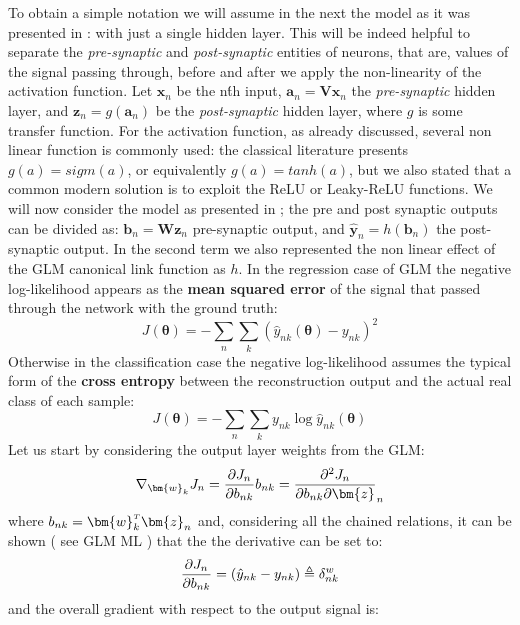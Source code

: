 To obtain a simple notation we will assume in the next the model as it was presented in \Figure{\ref{fig:mlp_a}}: with just a single hidden layer. This will be indeed helpful to separate the \textit{pre-synaptic} and \textit{post-synaptic} entities of neurons, that are, values of the signal passing through, before and after we apply the non-linearity of the activation function. Let $\bm{x}_n$ be the n\'th input, $\bm{a}_n = \bm{V}\bm{x}_n$ the \textit{pre-synaptic} hidden layer, and $\bm{z}_n = g(\bm{a}_n)$ be the \textit{post-synaptic} hidden layer, where $g$ is some transfer function. 
For the activation function, as already discussed, several non linear function is commonly used: the classical literature presents $g(a) = sigm(a)$, or equivalently $g(a) = tanh(a)$, but we also stated that a common modern solution is to exploit the ReLU or Leaky-ReLU functions. 
We will now consider the model as presented in \Equation{\ref{eq:mlp_a}}; the pre and post synaptic outputs can be divided as: $\bm{b}_n = \bm{W}\bm{z}_n$ pre-synaptic output, and $\hat{\bm{y}}_n = h(\bm{b}_n)$ the post-synaptic output. In the second term we also represented the non linear effect of the \acl{GLM} canonical link function as $h$.
In the regression case of \acl{GLM} the negative log-likelihood appears as the \textbf{mean squared error} of the signal that passed through the network with the ground truth:
\begin{equation}
    J(\bm{\theta}) = -\sum_n\sum_k \left(\hat{y}_{nk}(\bm{\theta}) - y_{nk}\right)^2
\end{equation}
Otherwise in the classification case the negative log-likelihood assumes the typical form of the \textbf{cross entropy} between the reconstruction output and the actual real class of each sample:
\begin{equation}
    J(\bm{\theta}) = -\sum_n\sum_k y_{nk} \log \hat{y}_{nk}(\bm{\theta})
\end{equation}
%
Let us start by considering the output layer weights from the \acl{GLM}:
\begin{equation}
    \nabla_{\bm{w}_k} J_n = \pdv{J_n}{b_{nk}} b_{nk} = \pdv{J_n}{b_{nk}} \bm{z}_n
\end{equation}
where $b_{nk} = \transpose{\bm{w}_k}\bm{z}_n$ and, considering all the chained relations, it can be shown ( see GLM ML ) that the the derivative can be set to:
\begin{equation}
    \pdv{J_n}{b_{nk}} = ( \hat{y}_{nk} - y_{nk} ) \triangleq \delta_{nk}^w
\end{equation}
and the overall gradient with respect to the output signal is:
